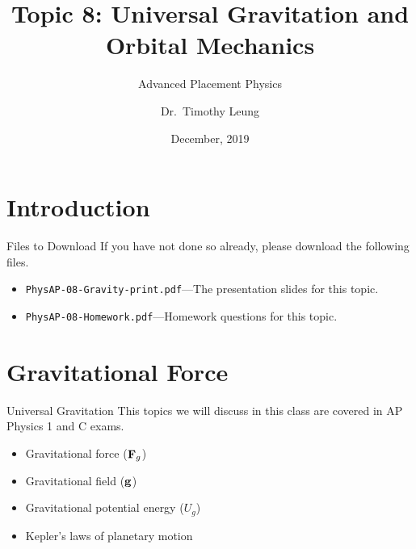 \documentclass[12pt,compress,aspectratio=169]{beamer}
\title{Topic 8: Universal Gravitation and Orbital Mechanics}
\subtitle{Advanced Placement Physics}
\author{Dr.\ Timothy Leung}
\institute{Olympiads School, Toronto, ON, Canada}
\date{December, 2019}
\newcommand{\mb}[1]{\ensuremath\mathbf{#1}}
\begin{document}
\begin{frame}
  \maketitle
\end{frame}


\section[Intro]{Introduction}

\begin{frame}{Files to Download}
  If you have not done so already, please download the following files.
  \begin{itemize}
  \item\texttt{PhysAP-08-Gravity-print.pdf}---The presentation slides for this
    topic.
  \item\texttt{PhysAP-08-Homework.pdf}---Homework questions for this topic.
  \end{itemize}
\end{frame}



\section{Gravitational Force}

\begin{frame}{Universal Gravitation}
  This topics we will discuss in this class are covered in AP Physics 1 and
  C exams.
  \begin{itemize}
  \item Gravitational force ($\mb{F}_g$)
  \item Gravitational field ($\mb{g}$)
  \item Gravitational potential energy  ($U_g$)
  \item Kepler's laws of planetary motion
  \end{itemize}
\end{frame}
\end{document}
